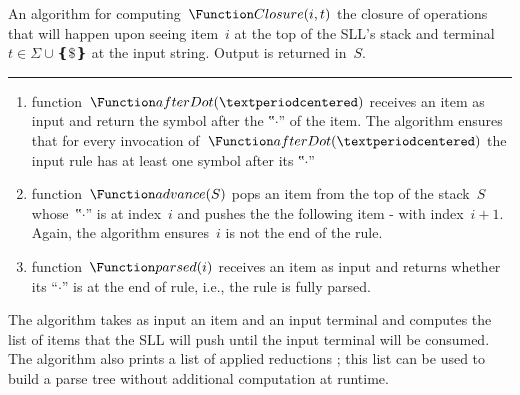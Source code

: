 \begin{algorithm}[p]
  \caption{\label{algorithm:sll-closure}
    An algorithm for computing~$\Function Closure(i,t)$ the closure
    of operations that will happen upon seeing item~$i$ at the top
    of the SLL's stack and terminal~$t∈Σ∪❴\$❵$ at the input string.
    Output is returned in~$S$.
  }
  \begin{algorithmic}
     
     
       
       
       
       
        \ENDWHILE
         
      \FI
       
    \ENDWHILE
     
  \end{algorithmic}
  \vspace{0.3ex}
  \hrule
  \vspace{0.3ex}
  \scriptsize
  \begin{enumerate}
    \item function~$\Function afterDot(·)$ receives an item as input
      and return the symbol after the ‟$·$” of the item.
      The algorithm ensures that for every invocation of~$\Function afterDot(·)$
      the input rule has at least one symbol after its ‟$·$”
    \item function~$\Function advance(S)$ pops an item from the top of
      the stack~$S$ whose~‟$·$” is at index~$i$ and pushes the
      the following item - with index~$i+1$.
      Again, the algorithm ensures~$i$ is not the end of the rule.
    \item function~$\Function parsed(i)$ receives an item as input
      and returns whether its ``$\cdot$'' is at the end of rule,
      i.e., the rule is fully parsed.
  \end{enumerate}

\end{algorithm}

The algorithm takes as input an item and an input terminal
  and computes the list of items that the SLL will push until
  the input terminal will be consumed.
The algorithm also prints a list of applied reductions ;
  this list can be used to build a parse tree without additional
  computation at runtime.

